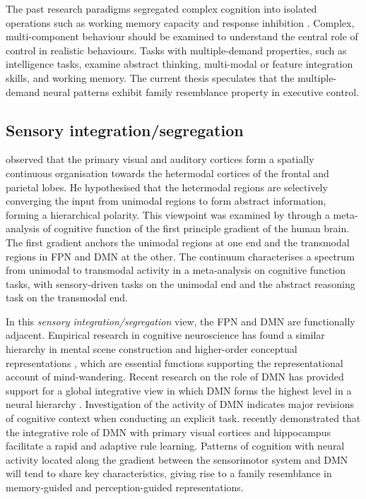The past research paradigms segregated complex cognition into isolated operations such as working memory capacity \cite{Vogel2004} and response inhibition \cite{Aron2004}. Complex, multi-component behaviour should be examined to understand the central role of control in realistic behaviours. Tasks with multiple-demand properties, such as intelligence tasks, examine abstract thinking, multi-modal or feature integration skills, and working memory. The current thesis speculates that the multiple-demand neural patterns exhibit family resemblance property in executive control. 

\subsection{Sensory integration/segregation}
 observed that the primary visual and auditory cortices form a spatially continuous organisation towards the hetermodal cortices of the frontal and parietal lobes. He hypothesised that the hetermodal regions are selectively converging the input from unimodal regions to form abstract information, forming a hierarchical polarity. This viewpoint was examined by  through a meta-analysis of cognitive function of the first principle gradient of the human brain. The first gradient anchors the unimodal regions at one end and the transmodal regions in FPN and DMN at the other. The continuum characterises a spectrum from unimodal to transmodal activity in a meta-analysis on cognitive function tasks, with sensory-driven tasks on the unimodal end and the abstract reasoning task on the transmodal end.

In this \textit{sensory integration/segregation} view, the FPN and DMN are functionally adjacent. Empirical research in cognitive neuroscience has found a similar hierarchy in mental scene construction \cite{Villena-Gonzalez2018} and higher-order conceptual representations \cite{Murphy2018}, which are essential functions supporting the representational account of mind-wandering. Recent research on the role of DMN has provided support for a global integrative view in which DMN forms the highest level in a neural hierarchy \cite{Margulies2016}. Investigation of the activity of DMN indicates major revisions of cognitive context when conducting an explicit task.  recently demonstrated that the integrative role of DMN with primary visual cortices and hippocampus facilitate a rapid and adaptive rule learning. 
Patterns of cognition with neural activity located along the gradient between the sensorimotor system and DMN will tend to share key characteristics, giving rise to a family resemblance in memory-guided and perception-guided representations.

